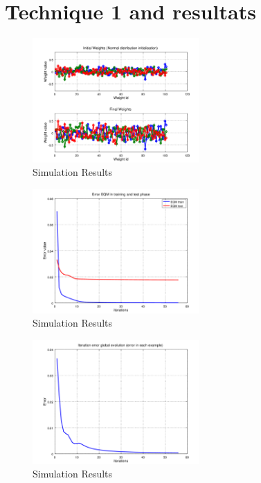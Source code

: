 \documentclass[journal]{IEEEtran}
\begin{document}
\section{Technique 1 and resultats}\blindtext

%
%
\blindtext
\begin{figure}[h]
	\centering
	\includegraphics[width=2.5in]{../OctaveNeurons/rs22}
	\caption{Simulation Results}
	\label{fig_sim}
\end{figure}
\blindtext
\begin{figure}[h]
	\centering
	\includegraphics[width=2.5in]{../OctaveNeurons/rs21}
	\caption{Simulation Results}
	\label{fig_sim}
\end{figure}
\blindtext
\begin{figure}[h]
	\centering
	\includegraphics[width=2.5in]{../OctaveNeurons/rs23}
	\caption{Simulation Results}
	\label{fig_sim}
\end{figure}
\end{document}
